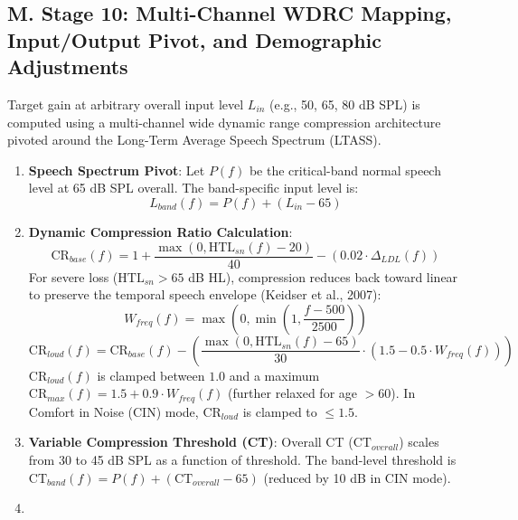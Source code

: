 \documentclass[
]{article}
\begin{document}
\subsection{M. Stage 10: Multi-Channel WDRC Mapping, Input/Output Pivot,
and Demographic
Adjustments}\label{m.-stage-10-multi-channel-wdrc-mapping-inputoutput-pivot-and-demographic-adjustments}

Target gain at arbitrary overall input level \(L_{in}\) (e.g., 50, 65,
80 dB SPL) is computed using a multi-channel wide dynamic range
compression architecture pivoted around the Long-Term Average Speech
Spectrum (LTASS).

\begin{enumerate}
\def\labelenumi{\arabic{enumi}.}
\item
  \textbf{Speech Spectrum Pivot}: Let \(P(f)\) be the critical-band
  normal speech level at 65 dB SPL overall. The band-specific input
  level is: \begin{equation}
  L_{band}(f) = P(f) + (L_{in} - 65)
  \end{equation}
\item
  \textbf{Dynamic Compression Ratio Calculation}: \begin{equation}
  \text{CR}_{base}(f) = 1 + \frac{\max\left(0, \text{HTL}_{sn}(f) - 20\right)}{40} - \left(0.02 \cdot \Delta_{LDL}(f)\right)
  \end{equation} For severe loss (\(\text{HTL}_{sn} > 65\) dB HL),
  compression reduces back toward linear to preserve the temporal speech
  envelope (Keidser et al., 2007): \begin{equation}
  W_{freq}(f) = \max\left(0, \min\left(1, \frac{f - 500}{2500}\right)\right)
  \end{equation} \begin{equation}
  \text{CR}_{loud}(f) = \text{CR}_{base}(f) - \left(\frac{\max(0, \text{HTL}_{sn}(f) - 65)}{30} \cdot (1.5 - 0.5 \cdot W_{freq}(f))\right)
  \end{equation} \(\text{CR}_{loud}(f)\) is clamped between \(1.0\) and
  a maximum \(\text{CR}_{max}(f) = 1.5 + 0.9 \cdot W_{freq}(f)\)
  (further relaxed for age \(> 60\)). In Comfort in Noise (CIN) mode,
  \(\text{CR}_{loud}\) is clamped to \(\le 1.5\).
\item
  \textbf{Variable Compression Threshold (CT)}: Overall CT
  (\(\text{CT}_{overall}\)) scales from 30 to 45 dB SPL as a function of
  threshold. The band-level threshold is
  \(\text{CT}_{band}(f) = P(f) + (\text{CT}_{overall} - 65)\) (reduced
  by 10 dB in CIN mode).
\item

\end{enumerate}
\end{document}
